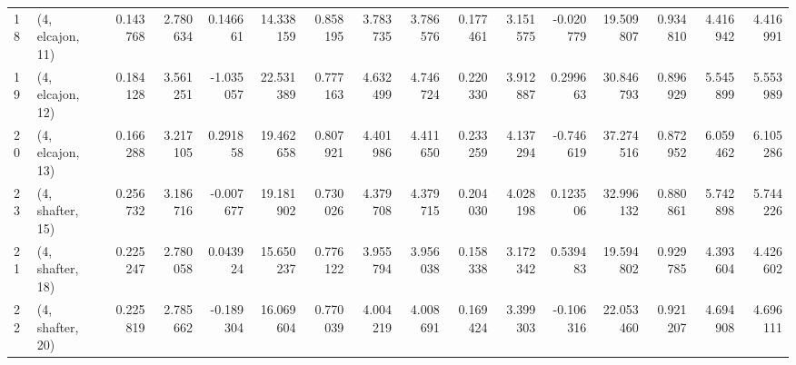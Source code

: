 \begin{tabular}{llrrrrrrrrrrrrrr}
18 &  (4, elcajon, 11) &   0.143768 &  2.780634 &  0.146661 &   14.338159 &  0.858195 &   3.783735 &   3.786576 &  0.177461 &   3.151575 & -0.020779 &   19.509807 &  0.934810 &   4.416942 &   4.416991 \\
19 &  (4, elcajon, 12) &   0.184128 &  3.561251 & -1.035057 &   22.531389 &  0.777163 &   4.632499 &   4.746724 &  0.220330 &   3.912887 &  0.299663 &   30.846793 &  0.896929 &   5.545899 &   5.553989 \\
20 &  (4, elcajon, 13) &   0.166288 &  3.217105 &  0.291858 &   19.462658 &  0.807921 &   4.401986 &   4.411650 &  0.233259 &   4.137294 & -0.746619 &   37.274516 &  0.872952 &   6.059462 &   6.105286 \\
23 &  (4, shafter, 15) &   0.256732 &  3.186716 & -0.007677 &   19.181902 &  0.730026 &   4.379708 &   4.379715 &  0.204030 &   4.028198 &  0.123506 &   32.996132 &  0.880861 &   5.742898 &   5.744226 \\
21 &  (4, shafter, 18) &   0.225247 &  2.780058 &  0.043924 &   15.650237 &  0.776122 &   3.955794 &   3.956038 &  0.158338 &   3.172342 &  0.539483 &   19.594802 &  0.929785 &   4.393604 &   4.426602 \\
22 &  (4, shafter, 20) &   0.225819 &  2.785662 & -0.189304 &   16.069604 &  0.770039 &   4.004219 &   4.008691 &  0.169424 &   3.399303 & -0.106316 &   22.053460 &  0.921207 &   4.694908 &   4.696111 \\
\bottomrule
\end{tabular}
